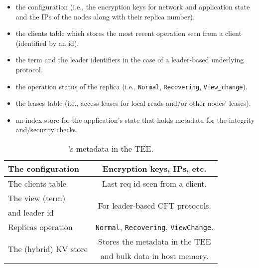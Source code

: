 \begin{itemize}
    \item the configuration (i.e., the encryption keys for network and application state and the IPs of the nodes along with their replica number).
    \item the clients table which stores the most recent operation seen from a client (identified by an id).
    \item the term and the leader identifiers in the case of a leader-based underlying protocol.
    \item the operation status of the replica (i.e., \texttt{Normal}, \texttt{Recovering}, \texttt{View\_change}).
    \item the leases table (i.e., access leases for local reads and/or other nodes' leases).
    \item an index store for the application's state that holds metadata for the integrity and/security checks.
\end{itemize}
\fi




\begin{table}[t]
\fontsize{9}{10}\selectfont 


\begin{center}
\begin{tabular}{ |l|c| }
 \hline
 \multirow{1}{*}{The configuration} & Encryption keys, IPs, etc.\\ \hline
 \multirow{1}{*}{The clients table} & \multirow{1}{*}{Last req id seen from a client.}\\ \hline
 The view (term) & \multirow{2}{*}{For leader-based CFT protocols.}\\ and leader id & \\ \hline
 Replicas operation &  \texttt{Normal}, \texttt{Recovering}, \texttt{ViewChange}.\\ \hline
 \multirow{2}{*}{The (hybrid) KV store} & Stores the metadata in the TEE\\
 &  and bulk data in host memory.\\ \hline
\end{tabular}
\end{center}
\caption{\projecttitle{}'s metadata in the TEE.}\label{tab:meta}
\end{table}


